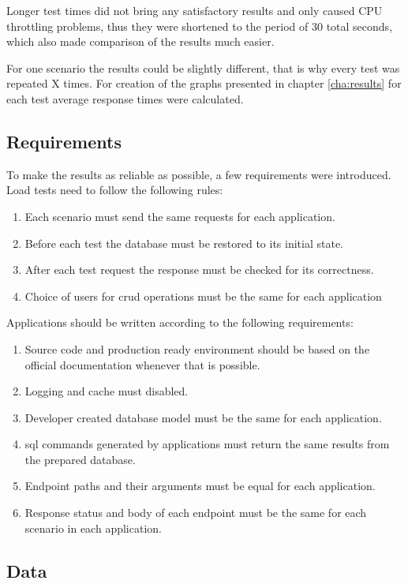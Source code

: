 Longer test times did not bring any satisfactory results and only caused CPU throttling problems, thus they were shortened to the period of 30 total seconds, which also made comparison of the results much easier.

For one scenario the results could be slightly different, that is why every test was repeated X times. For creation of the graphs presented in chapter \ref{cha:results} for each test average response times were calculated.


\subsection{Requirements}

To make the results as reliable as possible, a few requirements were introduced. Load tests need to follow the following rules:
\begin{enumerate}
  \item Each scenario must send the same requests for each application.
  \item Before each test the database must be restored to its initial state.
  \item After each test request the response must be checked for its correctness.
  \item Choice of users for \acrshort{crud} operations must be the same for each application
\end{enumerate}

Applications should be written according to the following requirements:
\begin{enumerate}
  \item Source code and production ready environment should be based on the official documentation whenever that is possible.
  \item Logging and cache must disabled.
  \item Developer created database model must be the same for each application.
  \item \acrshort{sql} commands generated by applications must return the same results from the prepared database.
  \item Endpoint paths and their arguments must be equal for each application.
  \item Response status and body of each endpoint must be the same for each scenario in each application.
\end{enumerate}

\subsection{Data}\label{sub:population}

